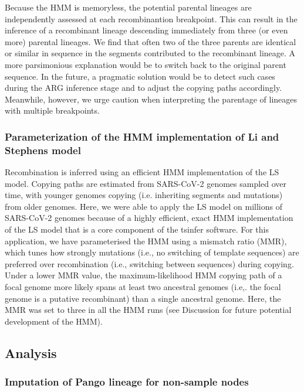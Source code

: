 \documentclass{article}
\begin{document}
Because the HMM is memoryless, the potential parental lineages are
independently assessed at each recombinantion breakpoint. This can result in
the inference of a recombinant lineage descending immediately from three (or
even more) parental lineages. We find that often two of the three parents are
identical or similar in sequence in the segments contributed to the recombinant
lineage. A more parsimonious explanation would be to switch back to the
original parent sequence. In the future, a pragmatic solution would be to
detect such cases during the ARG inference stage and to adjust the copying
paths accordingly. Meanwhile, however, we urge caution when interpreting the
parentage of lineages with multiple breakpoints.

\subsubsection{Parameterization of the HMM implementation of Li and Stephens
model}

Recombination is inferred using an efficient HMM implementation of the LS
model. Copying paths are estimated from SARS-CoV-2 genomes sampled over time,
with younger genomes copying (i.e. inheriting segments and mutations) from
older genomes. Here, we were able to apply the LS model on millions of
SARS-CoV-2 genomes because of a highly efficient, exact HMM implementation of
the LS model that is a core component of the tsinfer software. For this
application, we have parameterised the HMM using a mismatch ratio (MMR), which
tunes how strongly mutations (i.e., no switching of template sequences) are
preferred over recombination (i.e., switching between sequences) during
copying. Under a lower MMR value, the maximum-likelihood HMM copying path of a
focal genome more likely spans at least two ancestral genomes (i.e,. the focal
genome is a putative recombinant) than a single ancestral genome. Here, the MMR
was set to three in all the HMM runs (see Discussion for future potential
development of the HMM).

\subsection{Analysis}

\subsubsection{Imputation of Pango lineage for non-sample nodes}
\end{document}
